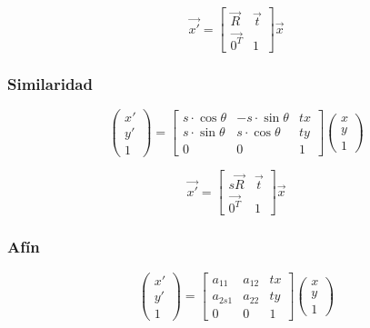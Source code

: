 \begin{equation}
\vec{x'}= 
\begin{bmatrix}
{\vec{R}}&{\vec{t}}\\
{\vec{0^T}}&{1}
\end{bmatrix}
\vec{x}
\label{bloque-isometria}
\end{equation}


\subsubsection*{Similaridad}

\begin{equation}
\begin{pmatrix}
{x'}\\{y'}\\{1}
\end{pmatrix} = 
\begin{bmatrix}
{s\cdot \cos \theta}&{-s\cdot \sin \theta}&{tx}\\
{s\cdot \sin \theta}&{s\cdot \cos \theta}&{ty}\\
{0}&{0}&{1}
\end{bmatrix}
\begin{pmatrix}
{x}\\{y}\\{1}
\end{pmatrix}
\label{matriz-similaridad}
\end{equation}

\begin{equation}
\vec{x'}= 
\begin{bmatrix}
{s\vec{R}}&{\vec{t}}\\
{\vec{0^T}}&{1}
\end{bmatrix}
\vec{x}
\label{bloque-similaridad}
\end{equation}


\subsubsection*{Afín}

\begin{equation}
\begin{pmatrix}
{x'}\\{y'}\\{1}
\end{pmatrix} = 
\begin{bmatrix}
{a_{11}}&{a_{12}}&{tx}\\
{a_{2s1}}&{a_{22}}&{ty}\\
{0}&{0}&{1}
\end{bmatrix}
\begin{pmatrix}
{x}\\{y}\\{1}
\end{pmatrix}
\label{matriz-afin}
\end{equation}

